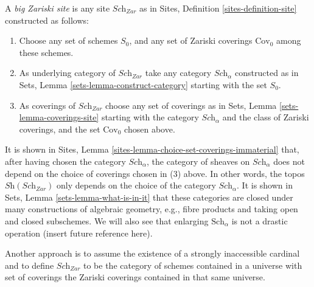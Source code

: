 \begin{definition}
\label{definition-big-zariski-site}
A {\it big Zariski site} is any site $\textit{Sch}_{Zar}$ as in
Sites, Definition \ref{sites-definition-site} constructed as follows:
\begin{enumerate}
\item Choose any set of schemes $S_0$, and any set of Zariski coverings
$\text{Cov}_0$ among these schemes.
\item As underlying category of $\textit{Sch}_{Zar}$
take any category $\textit{Sch}_\alpha$ constructed as in
Sets, Lemma \ref{sets-lemma-construct-category} starting with the set $S_0$.
\item As coverings of $\textit{Sch}_{Zar}$ choose any set of coverings as in
Sets, Lemma \ref{sets-lemma-coverings-site} starting with the
category $\textit{Sch}_\alpha$ and the class of Zariski coverings,
and the set $\text{Cov}_0$ chosen above.
\end{enumerate}
\end{definition}

\noindent
It is shown in Sites, Lemma \ref{sites-lemma-choice-set-coverings-immaterial}
that, after having chosen the category $\textit{Sch}_\alpha$, the
category of sheaves on $\textit{Sch}_\alpha$ does not depend on the
choice of coverings chosen in (3) above. In other words, the topos
$\textit{Sh}(\textit{Sch}_{Zar})$ only depends on the choice of
the category $\textit{Sch}_\alpha$. It is shown in
Sets, Lemma \ref{sets-lemma-what-is-in-it} that these categories
are closed under many constructions of algebraic geometry, e.g.,
fibre products and taking open and closed subschemes. We will also
see that enlarging $\text{Sch}_\alpha$ is not a drastic operation
(insert future reference here).

\medskip\noindent
Another approach is to assume the existence of a
strongly inaccessible cardinal and to define $\textit{Sch}_{Zar}$
to be the category of schemes contained in a universe with
set of coverings the Zariski coverings contained in that same
universe.

